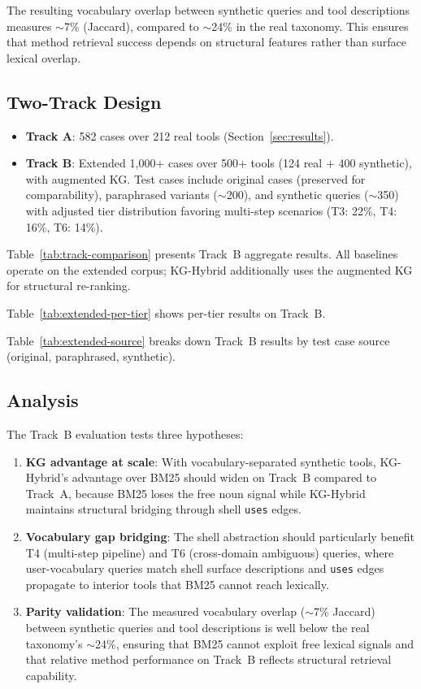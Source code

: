 \documentclass[11pt,a4paper]{article}
\begin{document}
The resulting vocabulary overlap between synthetic queries and tool descriptions measures $\sim$7\% (Jaccard), compared to $\sim$24\% in the real taxonomy. This ensures that method retrieval success depends on structural features rather than surface lexical overlap.

\subsection{Two-Track Design}

\begin{itemize}
  \item \textbf{Track A}: 582 cases over 212 real tools (Section~\ref{sec:results}).
  \item \textbf{Track B}: Extended 1,000+ cases over 500+ tools (124 real + 400 synthetic), with augmented KG. Test cases include original cases (preserved for comparability), paraphrased variants ($\sim$200), and synthetic queries ($\sim$350) with adjusted tier distribution favoring multi-step scenarios (T3: 22\%, T4: 16\%, T6: 14\%).
\end{itemize}

Table~\ref{tab:track-comparison} presents Track~B aggregate results. All baselines operate on the extended corpus; KG-Hybrid additionally uses the augmented KG for structural re-ranking.



Table~\ref{tab:extended-per-tier} shows per-tier results on Track~B.



Table~\ref{tab:extended-source} breaks down Track~B results by test case source (original, paraphrased, synthetic).



\subsection{Analysis}

The Track~B evaluation tests three hypotheses:
\begin{enumerate}
  \item \textbf{KG advantage at scale}: With vocabulary-separated synthetic tools, KG-Hybrid's advantage over BM25 should widen on Track~B compared to Track~A, because BM25 loses the free noun signal while KG-Hybrid maintains structural bridging through shell \texttt{uses} edges.
  \item \textbf{Vocabulary gap bridging}: The shell abstraction should particularly benefit T4 (multi-step pipeline) and T6 (cross-domain ambiguous) queries, where user-vocabulary queries match shell surface descriptions and \texttt{uses} edges propagate to interior tools that BM25 cannot reach lexically.
  \item \textbf{Parity validation}: The measured vocabulary overlap ($\sim$7\% Jaccard) between synthetic queries and tool descriptions is well below the real taxonomy's $\sim$24\%, ensuring that BM25 cannot exploit free lexical signals and that relative method performance on Track~B reflects structural retrieval capability.
\end{enumerate}
\end{document}
